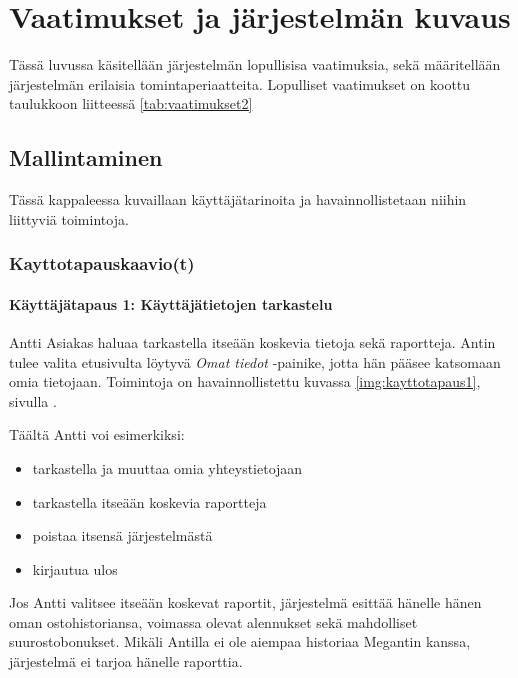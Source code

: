 \chapter{Vaatimukset ja järjestelmän kuvaus} %
\label{kuvaus} %
\thispagestyle{fancy} %

Tässä luvussa käsitellään järjestelmän lopullisisa vaatimuksia, sekä määritellään järjestelmän erilaisia tomintaperiaatteita. Lopulliset vaatimukset on koottu taulukkoon liitteessä \ref{tab:vaatimukset2}  

\section{Mallintaminen}  %
    Tässä kappaleessa kuvaillaan käyttäjätarinoita ja havainnollistetaan niihin liittyviä toimintoja. 

\subsection{Kayttotapauskaavio(t)}    %

\subsubsection{Käyttäjätapaus 1: Käyttäjätietojen tarkastelu}   %

    Antti Asiakas haluaa tarkastella itseään koskevia tietoja sekä raportteja. Antin tulee valita etusivulta löytyvä
    \textit{Omat tiedot} -painike, jotta hän pääsee katsomaan omia tietojaan. Toimintoja on havainnollistettu kuvassa \ref{img:kayttotapaus1}, sivulla \pageref{img:kayttotapaus1}.

    Täältä Antti voi esimerkiksi:

    \begin{itemize}
        \item tarkastella ja muuttaa omia yhteystietojaan
        \item tarkastella itseään koskevia raportteja
        \item poistaa itsensä järjestelmästä
        \item kirjautua ulos
    \end{itemize}

    Jos Antti valitsee itseään koskevat raportit, järjestelmä esittää hänelle hänen oman ostohistoriansa,
    voimassa olevat alennukset sekä mahdolliset suurostobonukset.
    Mikäli Antilla ei ole aiempaa historiaa Megantin kanssa, järjestelmä ei tarjoa hänelle raporttia.

